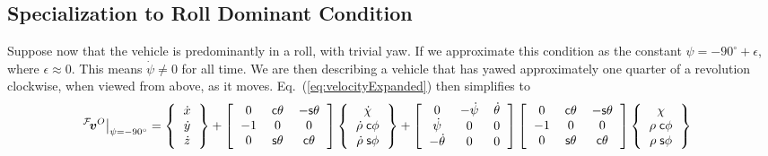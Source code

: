 \documentclass[10pt,twocolumn,reqno]{amsart}
\begin{document}
\subsection{Specialization to Roll Dominant Condition}
Suppose now that the vehicle is predominantly in a roll, with trivial yaw.
If we approximate this condition as the constant $\psi = -90^{\circ} + \epsilon$, 
where $\epsilon \approx 0$.
This means  $\dot{\psi} \neq 0$ for all time.  We are then describing 
a vehicle that has yawed approximately one quarter of a revolution clockwise, 
when viewed from above, as it moves.
Eq.~(\ref{eq:velocityExpanded}) then simplifies to 
\begin{eqnarray}
\left.\hframe{F}\vv^{O}\right|_{\psi=-90^{\circ}}
&= 
\left\{  
	\begin{tabular}{c}
 	  	$\dot{x}$ \\ 
 		$\dot{y}$ \\ 
 		$\dot{z}$
 	\end{tabular}
\right\}
+
\left[
  \begin{tabular}{ccc}
  $0$  	& $\hcos \theta$ & $-\hsin \theta$ \\ 
  $-1$   & $0$ & $0$ \\
  $0$   & $ \hsin \theta$ & $\hcos \theta$  
  \end{tabular}
\right]
\left\{  
	\begin{tabular}{c}
 	  	$\dot{\chi}$ \\ 
 		$\dot{\rho} \; \hcos \phi$ \\ 
 		$\dot{\rho} \; \hsin \phi$
 	\end{tabular}
\right\}
+
\left[
  \begin{tabular}{ccc}
  $0$  & $-\dot{\psi}$ & $\dot{\theta}$ \\ 
  $\dot{\psi}$   & $0$ & $0$ \\
  $-\dot{\theta}$  & $0$ & $0$  
  \end{tabular}
\right]
\left[
  \begin{tabular}{ccc}
  $0$  	& $\hcos \theta$ & $-\hsin \theta$ \\ 
  $-1$   & $0$ & $0$ \\
  $0$   & $ \hsin \theta$ & $\hcos \theta$  
  \end{tabular}
\right]
\left\{  
	\begin{tabular}{c}
 	  	$\chi$ \\ 
 		$\rho \; \hcos \phi$ \\ 
 		$\rho \; \hsin \phi$
 	\end{tabular}
\right\}

\end{eqnarray}
\end{document}
